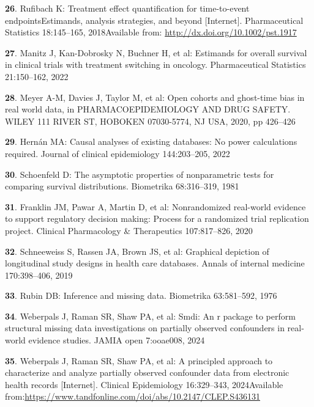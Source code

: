 \documentclass[
  letterpaper,
  DIV=11,
  numbers=noendperiod]{scrartcl}
\newlength{\cslhangindent}
\newenvironment{CSLReferences}[2] %
 {\begin{list}{}{%
  \setlength{\itemindent}{0pt}
  \setlength{\leftmargin}{0pt}
  \setlength{\parsep}{0pt}
  \ifodd #1
   \setlength{\leftmargin}{\cslhangindent}
   \setlength{\itemindent}{-1\cslhangindent}
  \fi
  \setlength{\itemsep}{#2\baselineskip}}}
 {\end{list}}
\begin{document}
\begin{CSLReferences}{0}{1}
\textbf{26}. Rufibach K: Treatment effect quantification for
time{-}to{-}event endpoints{\textendash}Estimands, analysis strategies,
and beyond {[}Internet{]}. Pharmaceutical Statistics 18:145--165,
2018Available from: \url{http://dx.doi.org/10.1002/pst.1917}

\textbf{27}. Manitz J, Kan-Dobrosky N, Buchner H, et al: Estimands for
overall survival in clinical trials with treatment switching in
oncology. Pharmaceutical Statistics 21:150--162, 2022

\textbf{28}. Meyer A-M, Davies J, Taylor M, et al: Open cohorts and
ghost-time bias in real world data, in PHARMACOEPIDEMIOLOGY AND DRUG
SAFETY. WILEY 111 RIVER ST, HOBOKEN 07030-5774, NJ USA, 2020, pp
426--426

\textbf{29}. Hernán MA: Causal analyses of existing databases: No power
calculations required. Journal of clinical epidemiology 144:203--205,
2022

\textbf{30}. Schoenfeld D: The asymptotic properties of nonparametric
tests for comparing survival distributions. Biometrika 68:316--319, 1981

\textbf{31}. Franklin JM, Pawar A, Martin D, et al: Nonrandomized
real-world evidence to support regulatory decision making: Process for a
randomized trial replication project. Clinical Pharmacology \&
Therapeutics 107:817--826, 2020

\textbf{32}. Schneeweiss S, Rassen JA, Brown JS, et al: Graphical
depiction of longitudinal study designs in health care databases. Annals
of internal medicine 170:398--406, 2019

\textbf{33}. Rubin DB: Inference and missing data. Biometrika
63:581--592, 1976

\textbf{34}. Weberpals J, Raman SR, Shaw PA, et al: Smdi: An r package
to perform structural missing data investigations on partially observed
confounders in real-world evidence studies. JAMIA open 7:ooae008, 2024

\textbf{35}. Weberpals J, Raman SR, Shaw PA, et al: A principled
approach to characterize and analyze partially observed confounder data
from electronic health records {[}Internet{]}. Clinical Epidemiology
16:329--343, 2024Available
from:\href{\%20\%0A\%20\%20\%20\%20\%0A\%20\%20\%20\%20\%0A\%20\%20\%20\%20\%20\%20\%20\%20https://www.tandfonline.com/doi/abs/10.2147/CLEP.S436131\%0A\%20\%20\%20\%20\%0A\%0A}{https://www.tandfonline.com/doi/abs/10.2147/CLEP.S436131
}


\end{CSLReferences}
\end{document}
